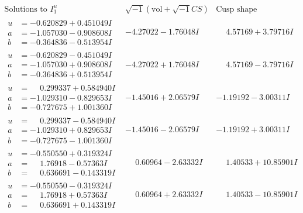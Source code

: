 \documentclass[1p]{elsarticle_modified}
\theoremstyle{definition}
\newcommand{\I}{\sqrt{-1}}
\begin{document}
$$\begin{array}{c|c|c}  
\text{Solutions to }I^u_{1}& \I (\text{vol} + \sqrt{-1}CS) & \text{Cusp shape}\\
 \hline 
\begin{aligned}
u &= -0.620829 + 0.451049 I \\
a &= -1.057030 - 0.908608 I \\
b &= -0.364836 - 0.513954 I\end{aligned}
 & -4.27022 - 1.76048 I & \phantom{-}4.57169 + 3.79716 I \\ \hline\begin{aligned}
u &= -0.620829 - 0.451049 I \\
a &= -1.057030 + 0.908608 I \\
b &= -0.364836 + 0.513954 I\end{aligned}
 & -4.27022 + 1.76048 I & \phantom{-}4.57169 - 3.79716 I \\ \hline\begin{aligned}
u &= \phantom{-}0.299337 + 0.584940 I \\
a &= -1.029310 - 0.829653 I \\
b &= -0.727675 + 1.001360 I\end{aligned}
 & -1.45016 + 2.06579 I & -1.19192 - 3.00311 I \\ \hline\begin{aligned}
u &= \phantom{-}0.299337 - 0.584940 I \\
a &= -1.029310 + 0.829653 I \\
b &= -0.727675 - 1.001360 I\end{aligned}
 & -1.45016 - 2.06579 I & -1.19192 + 3.00311 I \\ \hline\begin{aligned}
u &= -0.550550 + 0.319324 I \\
a &= \phantom{-}1.76918 - 0.57363 I \\
b &= \phantom{-}0.636691 - 0.143319 I\end{aligned}
 & \phantom{-}0.60964 - 2.63332 I & \phantom{-}1.40533 + 10.85901 I \\ \hline\begin{aligned}
u &= -0.550550 - 0.319324 I \\
a &= \phantom{-}1.76918 + 0.57363 I \\
b &= \phantom{-}0.636691 + 0.143319 I\end{aligned}
 & \phantom{-}0.60964 + 2.63332 I & \phantom{-}1.40533 - 10.85901 I \\ \hline\begin{aligned}

\end{aligned}
\end{array}$$
\end{document}
